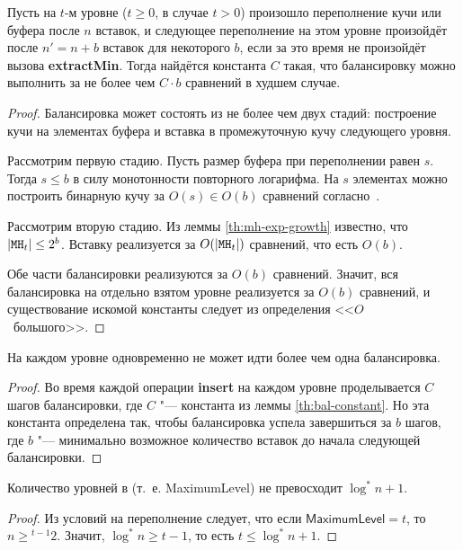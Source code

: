 \begin{lem} \label{th:bal-constant}
Пусть на $t$-м уровне ($t \geq 0$, в случае \CH[*] $t > 0$)
произошло переполнение кучи \MH[t] или буфера
после $n$ вставок, и следующее переполнение на этом уровне
произойдёт после $n' = n + b$ вставок для некоторого $b$,
если за это время не произойдёт вызова \textbf{extractMin}.
Тогда найдётся константа $C$ такая, что балансировку можно
выполнить за не более чем $C \cdot b$ сравнений в худшем случае.
\end{lem}
\begin{proof}
Балансировка может состоять из не более чем двух стадий:
построение кучи на элементах буфера и вставка в промежуточную
кучу следующего уровня.

Рассмотрим первую стадию. Пусть размер буфера при переполнении
равен $s$. Тогда $s \leq b$ в силу монотонности повторного логарифма.
На $s$ элементах можно построить бинарную кучу за $O(s) \in O(b)$ сравнений
согласно~\cite[с.~181]{Cormen}.

Рассмотрим вторую стадию. Из леммы \ref{th:mh-exp-growth}
известно, что $|\MH[t]| \leq 2^b$. Вставку реализуется
за $O(|\MH[t]|)$ сравнений, что есть $O(b)$.

Обе части балансировки реализуются за $O(b)$ сравнений. Значит,
вся балансировка на отдельно взятом уровне реализуется за $O(b)$
сравнений, и существование искомой константы следует из определения
<<$O$~большого>>.
\end{proof}

\begin{lem} \label{th:one-balancing}
На каждом уровне одновременно не может идти более чем одна балансировка.
\end{lem}
\begin{proof}
Во время каждой операции \textbf{insert} на каждом уровне проделывается
$C$ шагов балансировки, где $C$ "--- константа из леммы \ref{th:bal-constant}.
Но эта константа определена так, чтобы балансировка успела завершиться
за $b$ шагов, где $b$ "--- минимально возможное количество вставок
до начала следующей балансировки.
\end{proof}

\begin{lem} \label{th:log*-levels}
Количество уровней в \CH[*] (т.~е. \textsf{MaximumLevel}) не превосходит
$\log^* n + 1$.
\end{lem}
\begin{proof}
Из условий на переполнение следует, что если $\mathsf{MaximumLevel} = t$,
то $n \geq {}^{t-1}2$. Значит, $\log^* n \geq t-1$, то есть
$t \leq \log^* n + 1$.
\end{proof}


